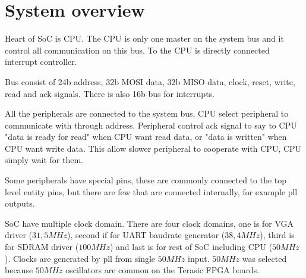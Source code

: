 \section{System overview}

Heart of SoC is CPU. The CPU is only one master on the system bus and it control
all communication on this bus. To the CPU is directly connected interrupt
controller.

Bus consist of 24b address, 32b MOSI data, 32b MISO data, clock, reset, write,
read and ack signals. There is also 16b bus for interrupts.

All the peripherals are connected to the system bus, CPU select peripheral to
communicate with through address. Peripheral control ack signal to say to CPU
"data is ready for read" when CPU want read data, or "data is written" when CPU
want write data. This allow slower peripheral to cooperate with CPU, CPU simply
wait for them.

Some peripherals have special pins, these are commonly connected to the top
level entity pins, but there are few that are connected internally, for example
pll outputs.

SoC have multiple clock domain. There are four clock domains, one is 
for VGA driver ($31,5 MHz$), second if for UART baudrate generator 
($38,4 MHz$), third is for SDRAM driver ($100 MHz$) and last is for 
rest of SoC including CPU ($50 MHz$). Clocks are generated by pll from 
single $50 MHz$ input. $50 MHz$ was selected because $50 MHz$ 
oscillators are common on the Terasic FPGA boards.

